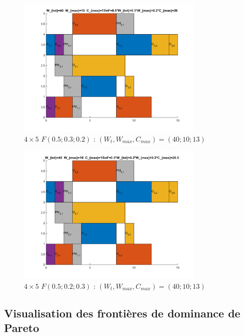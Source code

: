 \documentclass[10pt,a4paper]{scrartcl}
\begin{document}
\begin{figure}
  \centering
  \includegraphics[width=0.8\textwidth]{img/results4x5_F050302.png}
  \caption{$4 \times 5$ $F(0.5;0.3;0.2)$ : $(W_t, W_{max}, C_{max}) = (40; 10; 13)$}
\end{figure}
\begin{figure}
  \centering
  \includegraphics[width=0.8\textwidth]{img/results4x5_F050203.png}
  \caption{$4 \times 5$ $F(0.5;0.2;0.3)$ : $(W_t, W_{max}, C_{max}) = (40; 10; 13)$}
\end{figure}

\clearpage
\subsection{Visualisation des frontières de dominance de Pareto}
\label{annexe:visual_pareto}
\end{document}
